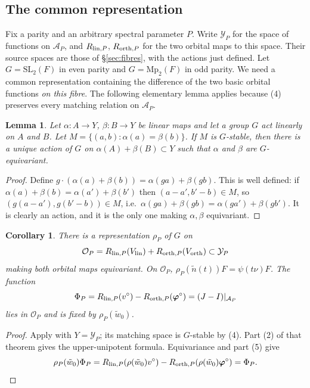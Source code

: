 \documentclass[11pt,oneside,notitlepage]{book}
\numberwithin{equation}{section}
\theoremstyle{plain}
\newtheorem{lemma}[theorem]{Lemma}
\newtheorem{corollary}[theorem]{Corollary}
\theoremstyle{definition}
\newcommand{\SL}{\mathrm{SL}}
\newcommand{\Mp}{\mathrm{Mp}}
\begin{document}
\subsection*{The common representation}

Fix a parity and an arbitrary spectral parameter $P$. Write $\mathcal Y_P$ for the space of functions on $\mathcal A_P$, and $R_{{\rm lin},P}$, $R_{{\rm orth},P}$ for the two orbital maps to this space. Their source spaces are those of \S\ref{sec:fibres}, with the actions just defined. Let $G=\SL_2(F)$ in even parity and $G=\Mp_2(F)$ in odd parity. We need a common representation containing the difference of the two basic orbital functions \emph{on this fibre}. The following elementary lemma applies because (4) preserves every matching relation on $\mathcal A_P$.

\begin{lemma}\label{lem:pushout}
Let $\alpha:A\to Y$, $\beta:B\to Y$ be linear maps and let a group $G$ act linearly on $A$ and $B$. Let $M=\{(a,b):\alpha(a)=\beta(b)\}$. If $M$ is $G$-stable, then there is a unique action of $G$ on $\alpha(A)+\beta(B)\subset Y$ such that $\alpha$ and $\beta$ are $G$-equivariant.
\end{lemma}
\begin{proof}
Define $g\cdot(\alpha(a)+\beta(b))=\alpha(ga)+\beta(gb)$. This is well defined: if $\alpha(a)+\beta(b)=\alpha(a')+\beta(b')$ then $(a-a',b'-b)\in M$, so $(g(a-a'),g(b'-b))\in M$, i.e.\ $\alpha(ga)+\beta(gb)=\alpha(ga')+\beta(gb')$. It is clearly an action, and it is the only one making $\alpha,\beta$ equivariant.
\end{proof}

\begin{corollary}\label{cor:common}
There is a representation $\rho_P$ of $G$ on
\[
 \mathcal O_P=R_{{\rm lin},P}(V_{\rm lin})
             +R_{{\rm orth},P}(V_{\rm orth})\subset\mathcal Y_P
\]
making both orbital maps equivariant. On $\mathcal O_P$,
$\rho_P(\tilde n(t))F=\psi(t\nu)F$. The function
\[
 \Phi_P=R_{{\rm lin},P}(v^\circ)
           -R_{{\rm orth},P}(\boldsymbol\varphi^\circ)
       =(J-I)|_{\mathcal A_P}
\]
lies in $\mathcal O_P$ and is fixed by $\rho_P(\tilde w_0)$.
\end{corollary}
\begin{proof}
Apply  with $Y=\mathcal Y_P$; its matching space is $G$-stable by (4). Part (2) of that theorem gives the upper-unipotent formula. Equivariance and part (5) give
\[
 \rho_P(\tilde w_0)\Phi_P
 =R_{{\rm lin},P}(\rho(\tilde w_0)v^\circ)
  -R_{{\rm orth},P}(\rho(\tilde w_0)\boldsymbol\varphi^\circ)
 =\Phi_P.
\]
\end{proof}
\end{document}
